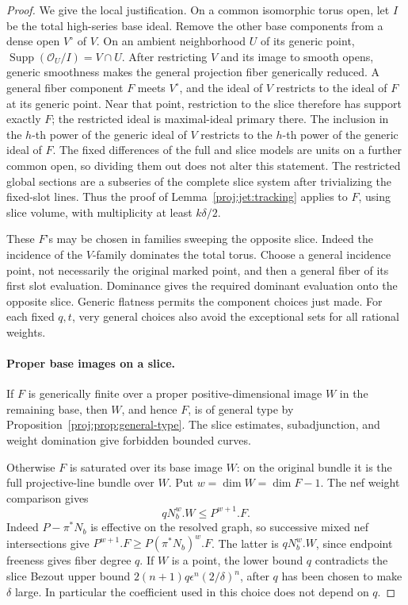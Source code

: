 \documentclass[11pt,letterpaper]{article}
\newcommand{\OO}{\mathcal{O}}
\DeclareMathOperator{\Supp}{Supp}
\theoremstyle{definition}
\theoremstyle{remark}
\begin{document}
\begin{proof}
We give the local justification.  On a common isomorphic torus
open, let \(I\) be the total high-series base ideal.  Remove the
other base components from a dense open \(V^\circ\) of \(V\).
On an ambient neighborhood \(U\) of its generic point,
\(\Supp(\OO_U/I)=V\cap U\).
After restricting \(V\) and its image to smooth opens, generic
smoothness makes the general projection fiber generically reduced.
A general fiber component \(F\) meets \(V^\circ\), and the ideal
of \(V\) restricts to the ideal of \(F\) at its generic point.
Near that point,
restriction to the slice therefore has support exactly \(F\);
the restricted ideal is maximal-ideal primary there.  The inclusion
in the \(h\)-th power of the generic ideal of \(V\) restricts to
the \(h\)-th power of the generic ideal of \(F\).
The fixed differences of the full and slice models are units on
a further common open, so dividing them out does not alter this
statement.  The restricted global sections are a subseries of
the complete slice system after trivializing the fixed-slot lines.
Thus the proof of Lemma~\ref{proj:jet:tracking} applies to \(F\), using
slice volume, with multiplicity at least \(k\delta/2\).

These \(F\)'s may be chosen in families sweeping the opposite
slice.  Indeed the incidence of the \(V\)-family dominates the
total torus.  Choose a general incidence point, not necessarily
the original marked point, and then a general fiber of its first
slot evaluation.  Dominance gives the required dominant evaluation
onto the opposite slice.  Generic flatness permits the component
choices just made.  For each fixed \(q,t\), very general choices
also avoid the exceptional sets for all rational weights.

\paragraph{Proper base images on a slice.}
If \(F\) is generically finite over a proper positive-dimensional
image \(W\) in the remaining base, then \(W\), and hence \(F\), is
of general type by Proposition~\ref{proj:prop:general-type}.
The slice estimates, subadjunction, and weight domination give
forbidden bounded curves.

Otherwise \(F\) is saturated over its base image \(W\): on the
original bundle it is the full projective-line bundle over \(W\).
Put \(w=\dim W=\dim F-1\).  The nef weight comparison gives
\begin{equation}\label{proj:jet:saturated-degree}
 qN_b^w.W\le P^{w+1}.F.
\end{equation}
Indeed \(P-\pi^*N_b\) is effective on the resolved graph, so
successive mixed nef intersections give
\(P^{w+1}.F\ge P(\pi^*N_b)^w.F\).  The latter is
\(qN_b^w.W\), since endpoint freeness gives fiber degree \(q\).
If \(W\) is a point, the lower bound \(q\) contradicts the slice
Bezout upper bound \(2(n+1)q\epsilon^n(2/\delta)^n\), after \(q\)
has been chosen to make \(\delta\) large.  In particular the
coefficient used in this choice does not depend on \(q\).


\end{proof}
\end{document}
